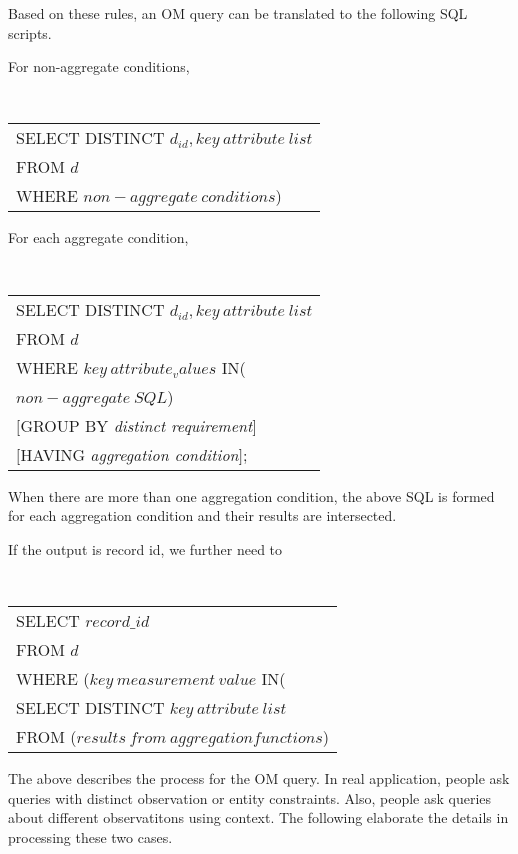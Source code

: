 Based on these rules, an OM query can be translated to the following
SQL scripts.

For non-aggregate conditions,

\vspace{0.1in}
{\tt
\begin{tabular}{l}
SELECT DISTINCT $d_{id}, key~attribute~list$\\
FROM $d$\\
WHERE $non-aggregate~conditions$)
\end{tabular}
}
\vspace{0.1in}

For each aggregate condition,

\vspace{0.1in}
{\tt
\begin{tabular}{l}
SELECT DISTINCT $d_{id}, key~attribute~list$\\
FROM $d$\\
WHERE $key~attribute_values$ IN(\\
\hspace{0.6in}$non-aggregate~SQL$)\\
$[$GROUP BY {\em distinct requirement}$]$\\
$[$HAVING {\em aggregation condition}$]$;
\end{tabular}
}
\vspace{0.1in}

When there are more than one aggregation condition,
the above SQL is formed for each aggregation condition
and their results are intersected.

If the output is record id, we further need to

\vspace{0.1in}
{\tt
\begin{tabular}{l}
SELECT $record\_id$\\
FROM $d$\\
WHERE ($key~measurement~value$ IN(\\
\hspace{0.5in}SELECT DISTINCT $key~attribute~list$\\
\hspace{0.5in}FROM ($results~from~aggregation functions$)
\end{tabular}
}
\vspace{0.1in}

The above describes the process for the OM query.
In real application, people ask queries with distinct
observation or entity constraints. Also, people ask queries about
different observatitons using context.
The following elaborate the details in processing these two cases.

